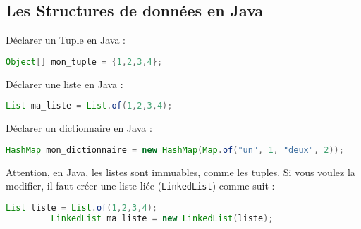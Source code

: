     \subsection{Les Structures de données en Java}
    Déclarer un Tuple en Java : \\
    
     \begin{lstlisting}[language=Java]
              Object[] mon_tuple = {1,2,3,4}; \end{lstlisting} 
              
    Déclarer une liste en Java : \\
    
    \begin{lstlisting}[language=Java]
              List ma_liste = List.of(1,2,3,4); \end{lstlisting}
            
    Déclarer un dictionnaire en Java : \\
    
    \begin{lstlisting}[language=Java]
              HashMap mon_dictionnaire = new HashMap(Map.of("un", 1, "deux", 2)); \end{lstlisting}
              
    Attention, en Java, les listes sont immuables, comme les tuples. Si vous voulez la modifier, il faut créer une liste liée (\lstinline{LinkedList}) comme suit : \\
    
    \begin{lstlisting}[language=Java]
             List liste = List.of(1,2,3,4);
	     LinkedList ma_liste = new LinkedList(liste); \end{lstlisting}
	     
